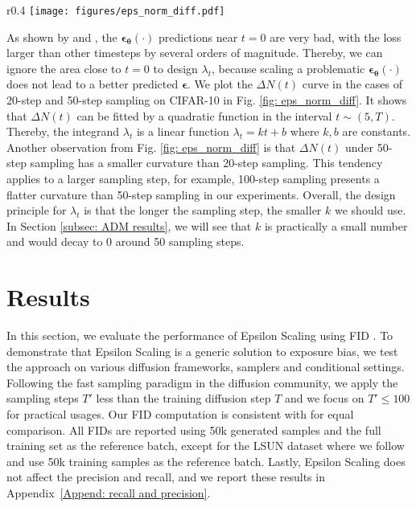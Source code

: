 \documentclass{article} \usepackage{iclr2024_conference,times}
\begin{document}
\begin{wrapfigure}{r}{0.4\textwidth}
\vskip -0.2in
  \texttt{[image: figures/eps\_norm\_diff.pdf]}
  \captionsetup{skip=2pt}  \caption{$\Delta N (t)$ at each timestep.}
\label{fig: eps_norm_diff}
\vskip -0.1in
\end{wrapfigure}

As shown by \citet{IDDPM} and \citet{benny2022dynamic}, the $\pmb{\epsilon_{\theta}}(\cdot)$ predictions near $t=0$ are very bad, with the loss larger than other timesteps by several orders of magnitude. Thereby, we can ignore the area close to $t=0$ to design $\lambda_t$, because scaling a problematic $\pmb{\epsilon_{\theta}}(\cdot)$ does not lead to a better predicted $\pmb{\epsilon}$. We plot the $\Delta N (t)$ curve in the cases of 20-step and 50-step sampling on CIFAR-10 in Fig. \ref{fig: eps_norm_diff}. It shows that $\Delta N (t)$ can be fitted by a quadratic function in the interval $t\sim(5, T)$. Thereby, the integrand $\lambda_t$ is a linear function $\lambda_t = kt+b$ where $k,b$ are constants. Another observation from Fig. \ref{fig: eps_norm_diff} is that $\Delta N (t)$ under 50-step sampling has a smaller curvature than 20-step sampling. This tendency applies to a larger sampling step, for example, 100-step sampling presents a flatter curvature than 50-step sampling in our experiments. Overall, the design principle for $\lambda_t$ is that the longer the sampling step, the smaller $k$ we should use. In Section \ref{subsec: ADM results}, we will see that $k$ is practically a small number and would decay to 0 around 50 sampling steps.



\section{Results}
\label{sec: results}
In this section, we evaluate the performance of Epsilon Scaling using FID \citep{FID}. To demonstrate that Epsilon Scaling is a generic solution to exposure bias, we test the approach on various diffusion frameworks, samplers and conditional settings. Following the fast sampling paradigm \citep{karras2022elucidating} in the diffusion community, we apply the sampling steps $T'$ less than the training diffusion step $T$ and we focus on $T'\leqslant100$ for practical usages. Our FID computation is consistent with
\citep{ADM} for equal comparison. All FIDs are reported using 50k generated samples and the full training set as the reference batch, except for the LSUN dataset where we follow \citep{ADM} and use 50k training samples as the reference batch. Lastly, Epsilon Scaling does not affect the precision and recall, and we report these results in Appendix~\ref{Append: recall and precision}.
\end{document}
